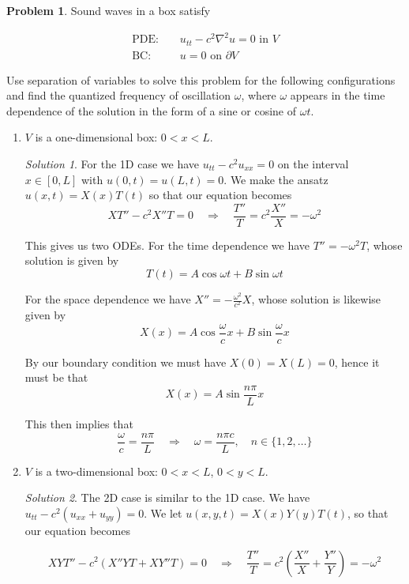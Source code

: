 \documentclass[12pt,a4paper]{article}
\theoremstyle{definition}
\newtheorem{problem}{Problem}
\theoremstyle{remark}
\newtheorem*{solution}{Solution}
\begin{document}
\begin{problem}
    Sound waves in a box satisfy 

    \begin{align*}
        \text{PDE: } && u_{tt} - c^2 \nabla^2 u = 0 \text{ in $V$} \\
        \text{BC: } && u = 0 \text{ on $\partial V$}
    \end{align*}

    Use separation of variables to solve this problem for the following configurations and find the quantized frequency of oscillation $\omega$, where $\omega$ appears in the time dependence of the solution in the form of a sine or cosine of $\omega t$. 

    \begin{enumerate}[label=(\alph*)]
        \item $V$ is a one-dimensional box: $0 < x < L$. 
        \begin{solution}
            For the 1D case we have $u_{tt} - c^2 u_{xx} = 0$ on the interval $x \in [0,L]$ with $u(0,t)=u(L,t)=0$. We make the ansatz $u(x,t)= X(x)T(t)$ so that our equation becomes $$XT''-c^2 X''T = 0 \quad \Rightarrow \quad \frac{T''}{T} = c^2 \frac{X''}{X} = -\omega^2$$

            This gives us two ODEs. For the time dependence we have $T'' = -\omega^2 T$, whose solution is given by $$T(t) = A \cos \omega t + B \sin \omega t$$

            For the space dependence we have $X'' = - \frac{\omega^2}{c^2} X$, whose solution is likewise given by $$X(x) = A \cos \frac{\omega}{c} x + B \sin \frac{\omega}{c} x$$

            By our boundary condition we must have $X(0) = X(L) = 0$, hence it must be that $$X(x) = A \sin \frac{n \pi}{L} x$$

            This then implies that $$\frac{\omega}{c} = \frac{n \pi}{L} \quad \Rightarrow \quad \omega = \frac{n \pi c}{L}, \quad n \in \{1, 2, \dots \}$$


        \end{solution}
        \item $V$ is a two-dimensional box: $0 < x < L$, $0 < y < L$. 
        \begin{solution}
            The 2D case is similar to the 1D case. We have $u_{tt} - c^2 (u_{xx} + u_{yy}) = 0$. We let $u(x, y, t) = X(x) Y(y) T(t)$, so that our equation becomes 

            $$XYT''-c^2 (X''YT + XY''T) = 0 \quad \Rightarrow \quad \frac{T''}{T} = c^2 \left(\frac{X''}{X} + \frac{Y''}{Y}\right) = -\omega^2$$


\end{solution}
\end{enumerate}
\end{problem}
\end{document}
